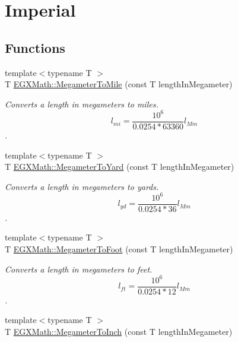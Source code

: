 \hypertarget{group___e_g_x_math-_conversions-_length_conversions-_s_i-_megameter-_imperial}{}\section{Imperial}
\label{group___e_g_x_math-_conversions-_length_conversions-_s_i-_megameter-_imperial}
\subsection*{Functions}
\begin{DoxyCompactItemize}
\item 
{\footnotesize template$<$typename T $>$ }\\T \mbox{\hyperlink{group___e_g_x_math-_conversions-_length_conversions-_s_i-_megameter-_imperial_gaa20a079fd7502961010c93e0091ab17c}{E\+G\+X\+Math\+::\+Megameter\+To\+Mile}} (const T length\+In\+Megameter)
\begin{DoxyCompactList}\small\item\em Converts a length in megameters to miles. \[ l_{mi}=\frac{10^{6}}{0.0254 * 63360} l_{Mm} \]. \end{DoxyCompactList}\item 
{\footnotesize template$<$typename T $>$ }\\T \mbox{\hyperlink{group___e_g_x_math-_conversions-_length_conversions-_s_i-_megameter-_imperial_gae8b77cb5d4f8cf566968e18dde870c74}{E\+G\+X\+Math\+::\+Megameter\+To\+Yard}} (const T length\+In\+Megameter)
\begin{DoxyCompactList}\small\item\em Converts a length in megameters to yards. \[ l_{yd}= \frac{10^{6}}{0.0254 * 36} l_{Mm} \]. \end{DoxyCompactList}\item 
{\footnotesize template$<$typename T $>$ }\\T \mbox{\hyperlink{group___e_g_x_math-_conversions-_length_conversions-_s_i-_megameter-_imperial_ga5586abd81d8635465b9be7f9be5fadc7}{E\+G\+X\+Math\+::\+Megameter\+To\+Foot}} (const T length\+In\+Megameter)
\begin{DoxyCompactList}\small\item\em Converts a length in megameters to feet. \[ l_{ft}= \frac{10^{6}}{0.0254 * 12} l_{Mm} \]. \end{DoxyCompactList}\item 
{\footnotesize template$<$typename T $>$ }\\T \mbox{\hyperlink{group___e_g_x_math-_conversions-_length_conversions-_s_i-_megameter-_imperial_ga21eaef4c8ebcc2982ac3a212dc462a95}{E\+G\+X\+Math\+::\+Megameter\+To\+Inch}} (const T length\+In\+Megameter)

\end{DoxyCompactItemize}

